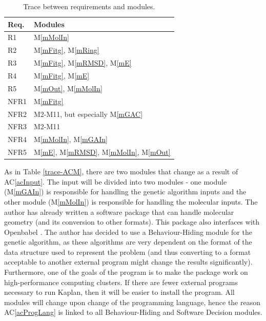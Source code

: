 \documentclass[12pt, titlepage]{article}
\newcommand{\acref}[1]{AC\ref{#1}}
\newcommand{\mref}[1]{M\ref{#1}}
\newcommand{\progname}{Kaplan} %
\begin{document}
\begin{table}[H]
\centering
\begin{tabular}{p{} p{}}
\toprule
\textbf{Req.} & \textbf{Modules}\\
\midrule
R1 & \mref{mMolIn} \\
R2 & \mref{mFitg}, \mref{mRing} \\
R3 & \mref{mFitg}, \mref{mRMSD}, \mref{mE} \\
R4 & \mref{mFitg}, \mref{mE} \\
R5 & \mref{mOut}, \mref{mMolIn} \\
NFR1 & \mref{mFitg} \\
NFR2 & M2-M11, but especially \mref{mGAC} \\
NFR3 & M2-M11 \\
NFR4 & \mref{mMolIn}, \mref{mGAIn} \\
NFR5 & \mref{mE}, \mref{mRMSD}, \mref{mMolIn}, \mref{mOut} \\
\bottomrule
\end{tabular}
\caption{Trace between requirements and modules.}
\label{TblRT}
\end{table}

As in Table \ref{trace-ACM}, there are two modules that change as a result of 
\acref{acInput}. The input will be divided into two modules - one module 
(\mref{mGAIn}) is responsible for handling the genetic algorithm inputs and the 
other module (\mref{mMolIn}) is responsible for handling the molecular inputs. 
The author has already written a software package that can handle molecular 
geometry (and its conversion to other formats). This package also interfaces 
with Openbabel \cite{obabel}. The author has decided to use a Behaviour-Hiding 
module for the genetic algorithm, as these algorithms are very dependent on the 
format of the data structure used to represent the problem (and thus converting 
to a format acceptable to another external program might change the results 
significantly). Furthermore, one of the goals of the program is to make the 
package work on high-performance computing clusters. If there are fewer 
external programs necessary to run \progname{}, then it will be easier to 
install the program. All modules will change upon change of the programming 
language, hence the reason \acref{acProgLang} is linked to all Behaviour-Hiding 
and Software Decision modules.
\end{document}
